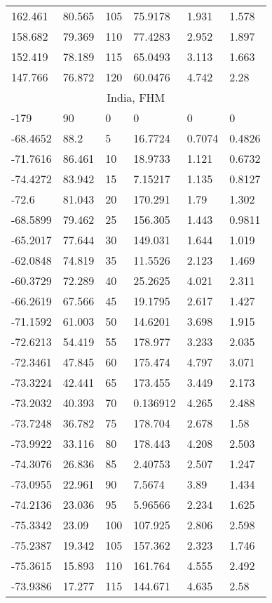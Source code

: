 \begin{longtable}[c]{@{}llllll@{}}
162.461 & 80.565 & 105 & 75.9178 & 1.931 & 1.578 \\
158.682 & 79.369 & 110 & 77.4283 & 2.952 & 1.897 \\
152.419 & 78.189 & 115 & 65.0493 & 3.113 & 1.663 \\
147.766 & 76.872 & 120 & 60.0476 & 4.742 & 2.28 \\
\multicolumn{6}{c}{India, FHM} \\
-179 & 90 & 0 & 0 & 0 & 0 \\
-68.4652 & 88.2 & 5 & 16.7724 & 0.7074 & 0.4826 \\
-71.7616 & 86.461 & 10 & 18.9733 & 1.121 & 0.6732 \\
-74.4272 & 83.942 & 15 & 7.15217 & 1.135 & 0.8127 \\
-72.6 & 81.043 & 20 & 170.291 & 1.79 & 1.302 \\
-68.5899 & 79.462 & 25 & 156.305 & 1.443 & 0.9811 \\
-65.2017 & 77.644 & 30 & 149.031 & 1.644 & 1.019 \\
-62.0848 & 74.819 & 35 & 11.5526 & 2.123 & 1.469 \\
-60.3729 & 72.289 & 40 & 25.2625 & 4.021 & 2.311 \\
-66.2619 & 67.566 & 45 & 19.1795 & 2.617 & 1.427 \\
-71.1592 & 61.003 & 50 & 14.6201 & 3.698 & 1.915 \\
-72.6213 & 54.419 & 55 & 178.977 & 3.233 & 2.035 \\
-72.3461 & 47.845 & 60 & 175.474 & 4.797 & 3.071 \\
-73.3224 & 42.441 & 65 & 173.455 & 3.449 & 2.173 \\
-73.2032 & 40.393 & 70 & 0.136912 & 4.265 & 2.488 \\
-73.7248 & 36.782 & 75 & 178.704 & 2.678 & 1.58 \\
-73.9922 & 33.116 & 80 & 178.443 & 4.208 & 2.503 \\
-74.3076 & 26.836 & 85 & 2.40753 & 2.507 & 1.247 \\
-73.0955 & 22.961 & 90 & 7.5674 & 3.89 & 1.434 \\
-74.2136 & 23.036 & 95 & 5.96566 & 2.234 & 1.625 \\
-75.3342 & 23.09 & 100 & 107.925 & 2.806 & 2.598 \\
-75.2387 & 19.342 & 105 & 157.362 & 2.323 & 1.746 \\
-75.3615 & 15.893 & 110 & 161.764 & 4.555 & 2.492 \\
-73.9386 & 17.277 & 115 & 144.671 & 4.635 & 2.58 \\

\end{longtable}
